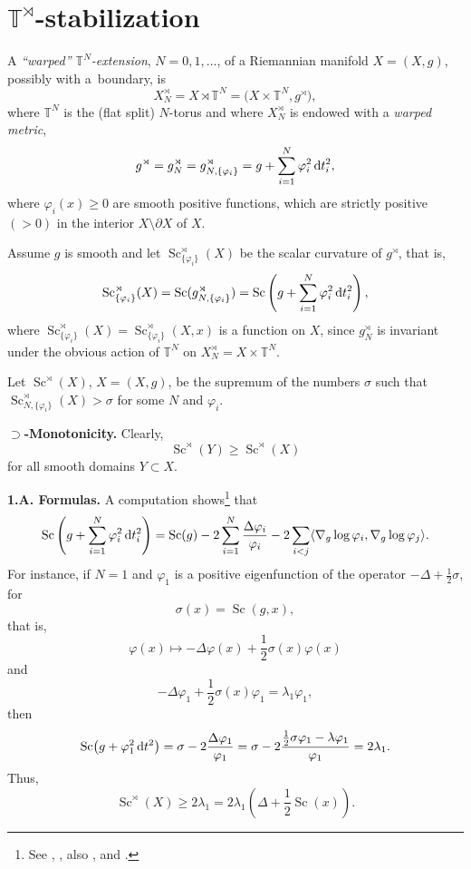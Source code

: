\documentclass[pdftex]{sigma}
\numberwithin{equation}{section}
\begin{document}
\section[T\^{}\{rtimes\}-stabilization]{$\boldsymbol{\mathbb T^\rtimes}$-stabilization}

A {\it ``warped'' $\mathbb T^N$-extension}, $N=0,1,\dots$,
of a Riemannian manifold $X=(X,g)$, possibly with a~boundary, is
\[
X_N^\rtimes=X\rtimes \mathbb T^N = \bigl(X\times \mathbb T^N, g^\rtimes\bigr),
\]
 where $\mathbb T^N$ is the (flat split) $N$-torus and where $X_N^\rtimes$ is endowed with a {\it warped metric},
\[
g^\rtimes= g_N^\rtimes =g_{N,\{\varphi_i\}}^\rtimes=g+\sum_{i=1}^N\varphi_i^2\,{\rm d}t_i^2,
\]
where
 $\varphi_i(x)\geq 0$ are smooth positive functions, which are strictly positive $(>0)$ in the interior $X\setminus \partial X$ of $X$.

Assume $g$ is smooth and let $\operatorname{Sc}^\rtimes_{\{\varphi_i\}} (X)$ be the scalar curvature of $g^\rtimes$, that is,
\[
\operatorname{Sc}^\rtimes_{\{\varphi_i\}} (X)=\operatorname{Sc}(g_{N,\{\varphi_i\}}^\rtimes)=\operatorname{Sc}\left(g+\sum_{i=1}^N\varphi_i^2\,{\rm d}t_i^2\right),
 \]
 where $\operatorname{Sc}^\rtimes_{\{\varphi_i\}} (X)=\operatorname{Sc}^\rtimes_{\{\varphi_i\}} (X,x)$ is a function on $X$, since $g_N^\rtimes$ is invariant under the obvious action of $\mathbb T^N$ on $X_N^\rtimes=X\times \mathbb T^N$.

Let $\operatorname{Sc}^\rtimes (X)$, $X=(X,g)$, be the supremum of the numbers $\sigma$ such that
 $\operatorname{Sc}_{N,\{\varphi_i\} }^\rtimes (X)>\sigma$ for some $N$ and $ \varphi_i$.

\textbf{$\boldsymbol{\supset}$-Monotonicity.} Clearly,
\[
\operatorname{Sc}^\rtimes (Y)\geq \operatorname{Sc}^\rtimes (X)
\]
 for all smooth domains $Y\subset X$.

\textbf {1.A. Formulas.} A computation shows\footnote{See \cite{F-CS1980}, \cite[formulas~(7.33) and (12.5)]{GL1983}, also \cite{Zhu2019}, and  \cite[Section~2.4.1]{Gr2021}.} that
\[
\operatorname{Sc}\left(g+\sum_{i=1}^N\varphi_i^2\,{\rm d}t_i^2\right)= \operatorname{Sc}(g)-2\sum^N_{i=1} \frac{\Delta\varphi_i} {\varphi_i}-2\sum_{i<j}
 \langle\nabla_g\log\varphi_i,\nabla_g\log\varphi_j
 \rangle.
 \]
 For instance, if $N=1$ and $\varphi_1$ is a positive eigenfunction of the operator
 $-\Delta+\frac{1}{2}\sigma$, for
\[
\sigma(x)=\operatorname{Sc}(g,x),
\]
that is,
\[
\varphi(x)\mapsto -\Delta \varphi(x) +\frac{1}{2}\sigma(x)\varphi(x)
\]
 and
\[
-\Delta \varphi_1 +\frac{1}{2}\sigma(x)\varphi_1=\lambda_1\varphi_1,
\]
 then
 \[
 \operatorname{Sc}\bigl(g+\varphi_1^2\,{\rm d}t^2\bigr)
 =\sigma -2\frac {\Delta\varphi_1} {\varphi_1}=\sigma -2 \frac{\frac{1}{2}\sigma\varphi_1- \lambda \varphi_1}{
 \varphi_1} =2\lambda_1.
 \]
Thus,
\[
\operatorname{Sc}^\rtimes (X)\geq 2\lambda_1=2\lambda_1\left(\Delta+\frac{1}{2}\operatorname{Sc}(x)\right).
\]
\end{document}
